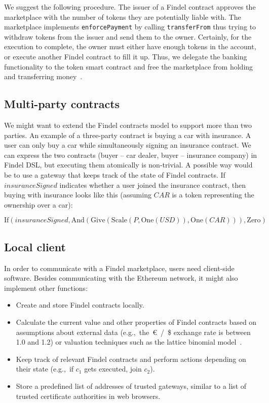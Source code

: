 We suggest the following procedure.
The issuer of a Findel contract approves the marketplace with the number of tokens they are potentially liable with.
The marketplace implements \texttt{enforcePayment} by calling \texttt{transferFrom} thus trying to withdraw tokens from the issuer and send them to the owner.
Certainly, for the execution to complete, the owner must either have enough tokens in the account, or execute another Findel contract to fill it up.
Thus, we delegate the banking functionality to the token smart contract and free the marketplace from holding and transferring money~\cite{Khovratovich2016}.


\subsection{Multi-party contracts}

We might want to extend the Findel contracts model to support more than two parties.
An example of a three-party contract is buying a car with insurance.
A user can only buy a car while simultaneously signing an insurance contract.
We can express the two contracts (buyer -- car dealer, buyer -- insurance company) in Findel DSL, but executing them atomically is non-trivial.
A possible way would be to use a gateway that keeps track of the state of Findel contracts.
If \(insuranceSigned\) indicates whether a user joined the insurance contract, then buying with insurance looks like this (assuming \(CAR\) is a token representing the ownership over a car):

\[\mathrm{If}(insuranceSigned,\mathrm{And}(\mathrm{Give}(\mathrm{Scale}(P,\mathrm{One}(USD)),\mathrm{One}(CAR))),\mathrm{Zero})\]


\subsection{Local client}

In order to communicate with a Findel marketplace, users need client-side software.
Besides communicating with the Ethereum network, it might also implement other functions:
\begin{itemize}
	\item Create and store Findel contracts locally.
	\item Calculate the current value and other properties of Findel contracts based on assumptions about external data (e.g.,~the~\euro~/~\$ exchange rate is between 1.0 and 1.2) or valuation techniques such as the lattice binomial model~\cite{Cox1979}.
	\item Keep track of relevant Findel contracts and perform actions depending on their state (e.g.,~if \(c_1\) gets executed, join \(c_2\)).
	\item Store a predefined list of addresses of trusted gateways, similar to a list of trusted certificate authorities in web browsers.
\end{itemize}



